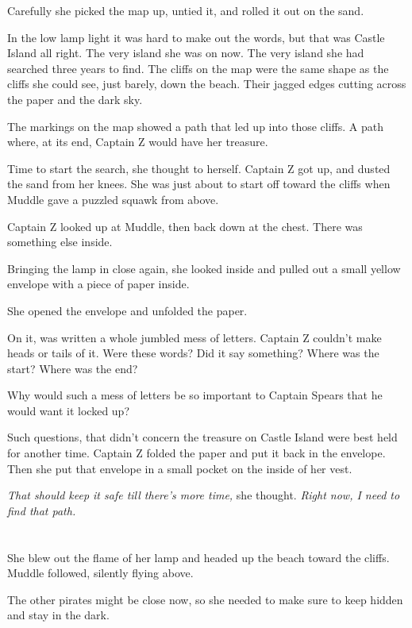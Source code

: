 \documentclass[12pt]{extbook}
\begin{document}
  Carefully she picked the map up, untied it, and rolled it out on the
  sand.
  
  In the low lamp light it was hard to make out the words, but that was
  Castle Island all right. The very island she was on now. The very island
  she had searched three years to find. The cliffs on the map were the
  same shape as the cliffs she could see, just barely, down the beach.
  Their jagged edges cutting across the paper and the dark sky.
  
  The markings on the map showed a path that led up into those cliffs. A
  path where, at its end, Captain Z would have her treasure.
  
  Time to start the search, she thought to herself. Captain Z got up, and
  dusted the sand from her knees. She was just about to start off toward
  the cliffs when Muddle gave a puzzled squawk from above.
  
  Captain Z looked up at Muddle, then back down at the chest. There was
  something else inside.
  
  Bringing the lamp in close again, she looked inside and pulled out a
  small yellow envelope with a piece of paper inside.
  
  She opened the envelope and unfolded the paper.
  
  On it, was written a whole jumbled mess of letters. Captain Z couldn't
  make heads or tails of it. Were these words? Did it say something? Where
  was the start? Where was the end?
  
  Why would such a mess of letters be so important to Captain Spears that
  he would want it locked up?
  
  Such questions, that didn't concern the treasure on Castle Island were
  best held for another time. Captain Z folded the paper and put it back
  in the envelope. Then she put that envelope in a small pocket on the
  inside of her vest.
  
  \emph{That should keep it safe till there's more time,} she thought.
  \emph{Right now, I need to find that path.}
  
  \section{}\label{section-12}
  
  She blew out the flame of her lamp and headed up the beach toward the
  cliffs. Muddle followed, silently flying above.
  
  The other pirates might be close now, so she needed to make sure to keep
  hidden and stay in the dark.
  
\end{document}
